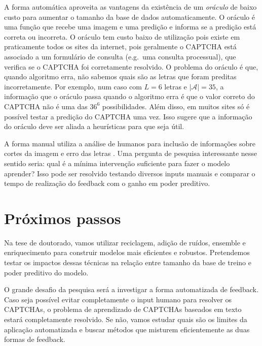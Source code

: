 \documentclass[12pt,]{report}
\begin{document}
A forma automática aproveita as vantagens da existência de um
\emph{oráculo} de baixo custo para aumentar o tamanho da base de dados
automaticamente. O oráculo é uma função que recebe uma imagem e uma
predição e informa se a predição está correta ou incorreta. O oráculo
tem custo baixo de utilização pois existe em praticamente todos os sites
da internet, pois geralmente o CAPTCHA está associado a um formulário de
consulta (e.g.~uma consulta processual), que verifica se o CAPTCHA foi
corretamente resolvido. O problema do oráculo é que, quando algoritmo
erra, não sabemos quais são as letras que foram preditas incorretamente.
Por exemplo, num caso com \(L=6\) letras e \(|\mathcal A|=35\), a
informação que o oráculo passa quando o algoritmo erra é que o valor
correto do CAPTCHA não é uma das \(36^6\) possibilidades. Além disso, em
muitos sites só é possível testar a predição do CAPTCHA uma vez. Isso
sugere que a informação do oráculo deve ser aliada a heurísticas para
que seja útil.

A forma manual utiliza a análise de humanos para inclusão de informações
sobre cortes da imagem e erro das letras \citep{bursztein2014end}. Uma
pergunta de pesquisa interessante nesse sentido seria: qual é a mínima
intervenção suficiente para fazer o modelo aprender? Isso pode ser
resolvido testando diversos inputs manuais e comparar o tempo de
realização do feedback com o ganho em poder preditivo.

\section{Próximos passos}\label{proximos-passos}

Na tese de doutorado, vamos utilizar reciclagem, adição de ruídos,
ensemble e enriquecimento para construir modelos mais eficientes e
robustos. Pretendemos testar os impactos dessas técnicas na relação
entre tamanho da base de treino e poder preditivo do modelo.

O grande desafio da pesquisa será a investigar a forma automatizada de
feedback. Caso seja possível evitar completamente o input humano para
resolver os CAPTCHAs, o problema de aprendizado de CAPTCHAs baseados em
texto estará completamente resolvido. Se não, vamos estudar quais são os
limites da aplicação automatizada e buscar métodos que misturem
eficientemente as duas formas de feedback.

\clearpage

\appendix {}
\end{document}
